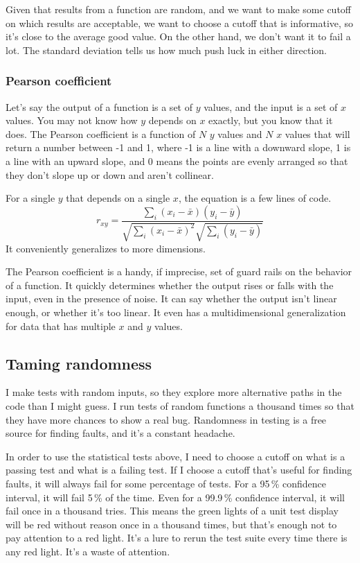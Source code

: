 \documentclass[fleqn,10pt]{olplainarticle}
\begin{document}
Given that results from a function are random, and we
want to make some cutoff on which results are acceptable,
we want to choose a cutoff that is informative, so it's
close to the average good value. On the other hand, we don't
want it to fail a lot. The standard deviation tells us
how much push luck in either direction.

\subsubsection{Pearson coefficient}
Let's say the output of a function is a set of $y$ values,
and the input is a set of $x$ values. You may not know
how $y$ depends on $x$ exactly, but you know that it
does. The Pearson coefficient is a function of
$N$ $y$ values and $N$ $x$ values that will return a number
between -1 and 1, where -1 is a line with a downward slope,
1 is a line with an upward slope, and 0 means the points
are evenly arranged so that they don't slope up or down
and aren't collinear.

For a single $y$ that depends on a single $x$, the equation
is a few lines of code.
\begin{equation}
r_{xy} = \frac{\sum_i (x_i - \bar{x})(y_i - \bar{y})}{\sqrt{\sum_i (x_i - \bar{x})^2}\sqrt{\sum_i(y_i - \bar{y})}}
\end{equation}
It conveniently generalizes to more dimensions.

The Pearson coefficient is a handy, if imprecise,
set of guard rails on the behavior of a function.
It quickly determines whether the output rises or falls with the input,
even in the presence of noise. It can say whether the output
isn't linear enough, or whether it's too linear.
It even has a multidimensional generalization for data that
has multiple $x$ and $y$ values.


\subsection{Taming randomness}

I make tests with random inputs, so they explore more alternative
paths in the code than I might guess. I run tests of random
functions a thousand times so that they have more chances to
show a real bug. Randomness in testing is a free source for
finding faults, and it's a constant headache.

In order to use the statistical tests above, I need to choose
a cutoff on what is a passing test and what is a failing test.
If I choose a cutoff that's useful for finding faults, it will
always fail for some percentage of tests. For a 95\,\% confidence
interval, it will fail 5\,\% of the time. Even for a
99.9\,\% confidence interval, it will fail once in a thousand
tries. This means the green lights of a unit test display will
be red without reason once in a thousand times, but that's
enough not to pay attention to a red light. It's a lure to
rerun the test suite every time there is any red light.
It's a waste of attention.
\end{document}
